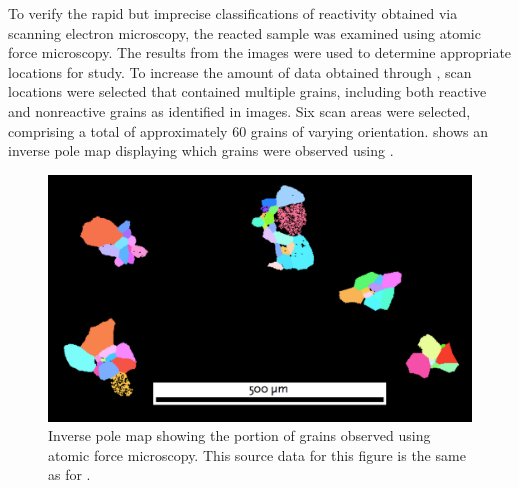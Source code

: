 To verify the rapid but imprecise classifications of reactivity obtained via
scanning electron microscopy, the reacted sample was examined using atomic force
microscopy. The results from the  images were used to determine appropriate
locations for study. To increase the amount of data obtained through , scan
locations were selected that contained multiple grains, including both reactive and
nonreactive grains as identified in  images. Six scan areas were selected,
comprising a total of approximately 60 grains of varying orientation.
 shows an inverse pole map displaying which grains were observed
using .
\begin{figure}
	\includegraphics[width=\textwidth]{fe2o3afmmap.pdf}
	\caption[Inverse pole map of grains observed using .]{%
		Inverse pole map showing the portion of grains observed using atomic force
microscopy. This source data for this 
		figure is the same as for .}
	\label{fig:fe2o3afmmap}
\end{figure}

